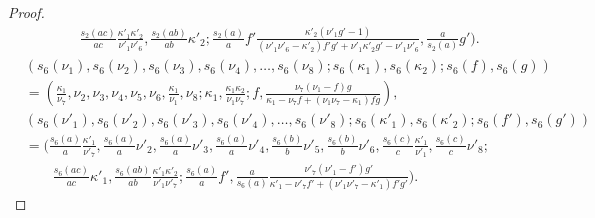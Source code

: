 \documentclass[10pt,a4paper]{amsart}
\begin{document}
\begin{proof}
\begin{align}
& \qquad \frac{s _2 (ac)}{ac} \frac{\kappa '_1 \kappa '_2 }{\nu '_1 \nu '_6} , \frac{s _2 (ab)}{ab} \kappa '_2 ; \frac{s _2 (a)}{a} f' \frac{\kappa '_2 ( \nu '_1 g' -1)}{(\nu ' _1 \nu '_6 - \kappa '_2  ) f' g' + \nu ' _1 \kappa '_2 g' - \nu ' _1 \nu '_6 } , \frac{a}{s _2 (a)} g' ) . \nonumber 
\end{align} 
\begin{align}
& (s _6 ( \nu _1) , s _6 (\nu _2) , s _6 ( \nu _3) , s _6 ( \nu _4) , \dots , s _6 (\nu _8) ;  s _6 (\kappa _1) , s _6 (\kappa _2) ;  s _6 (f ) , s _6 (g) ) \\
& =  (\frac{\kappa_1 }{\nu_7} , \nu_2 , \nu_3 , \nu_4 ,\nu_5 ,\nu_6 , \frac{\kappa_1 }{\nu_1} ,\nu_8 ; \kappa_1, \frac{\kappa_1 \kappa_2 }{\nu_1 \nu _7 } ;  f, \frac{\nu _7 ( \nu_1 - f ) g }{ \kappa_1  -  \nu _7 f + ( \nu _1 \nu_7 - \kappa_1 )fg } ) , \nonumber \\
& (s _6 ( \nu '_1) , s _6 (\nu '_2) , s _6 ( \nu '_3) , s _6 ( \nu '_4) , \dots , s _6 (\nu '_8) ; s _6 (\kappa '_1) , s _6 (\kappa '_2) ; s _6 (f' ) , s _6 (g') ) \nonumber \\& =  (\frac{s _6 (a)}{a} \frac{\kappa '_1 }{\nu '_7} , \frac{s _6 (a)}{a} \nu '_2 , \frac{s _6 (a)}{a} \nu '_3 , \frac{s _6 (a)}{a} \nu '_4 , \frac{s _6 (b)}{b} \nu '_5  , \frac{s _6 (b)}{b} \nu '_6 , \frac{s _6 (c)}{c} \frac{\kappa '_1 }{\nu '_1} , \frac{s _6 (c)}{c} \nu '_8 ; \nonumber \\
& \qquad \frac{s _6 (ac)}{ac} \kappa '_1, \frac{s _6 (ab)}{ab} \frac{\kappa '_1 \kappa '_2 }{\nu '_1 \nu '_7 } ;  \frac{s _6 (a)}{a} f', \frac{a}{s _6 (a)} \frac{\nu '_7 ( \nu '_1 - f' ) g' }{ \kappa '_1  -  \nu '_7 f' + ( \nu '_1 \nu '_7 - \kappa '_1 )f'g' } ) . \nonumber 
\end{align} 
\end{proof}
\end{document}
